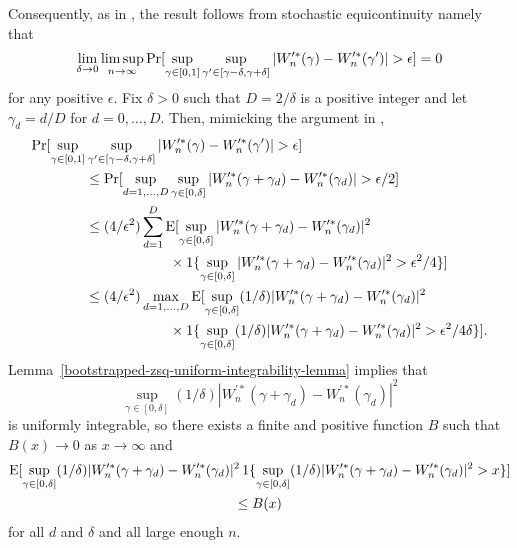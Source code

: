 \documentclass[11pt]{article}
\begin{document}
Consequently, as in \cite{JoD:00b}, the result follows from stochastic
equicontinuity \citep[Theorems 15.4 and 15.5]{Bil:68} namely that
\begin{equation*}
  \lim_{\delta \to 0} \limsup_{n \to \infty} \operatorname{Pr}[\sup_{\gamma \in [0,1]}
  \sup_{\gamma' \in [\gamma - \delta, \gamma + \delta]}
    | W_n^{\prime *}(\gamma) - W_n^{\prime *}(\gamma') | > \epsilon] = 0
\end{equation*}
for any positive $\epsilon$.  Fix $\delta> 0$ such that $D = 2/\delta$
is a positive integer and let $\gamma_d = d/D$ for $d =
0,\dots,D$. Then, mimicking the argument in \cite{JoD:00b},
\begin{align*}
  \operatorname{Pr}[\sup_{\gamma \in [0,1]} &
  \sup_{\gamma' \in [\gamma - \delta, \gamma + \delta]}
  | W_n^{\prime *}(\gamma) - W_n^{\prime *}(\gamma') | > \epsilon] \\
  &\leq \operatorname{Pr}[ \sup_{d = 1,\dots,D} \sup_{\gamma \in [0,\delta]}
  | W_n^{\prime *}(\gamma + \gamma_d) - W_n^{\prime *}(\gamma_d) | > \epsilon/2] \\
  &\leq  (4/\epsilon^2) \sum_{d=1}^D \operatorname{E}[\sup_{\gamma \in [0,\delta]}
  | W_n^{\prime *}(\gamma + \gamma_d) - W_n^{\prime *}(\gamma_d) |^2 \\
  &\qquad\qquad\qquad \times \operatorname{1}\{\sup_{\gamma \in [0,\delta]}
  | W_n^{\prime *}(\gamma + \gamma_d) - W_n^{\prime *}(\gamma_d) |^2 > \epsilon^2/4\}] \\
  &\leq  (4/\epsilon^2) \max_{d=1,\dots,D} \operatorname{E}[\sup_{\gamma \in [0,\delta]}
  (1/\delta) | W_n^{\prime *}(\gamma + \gamma_d) - W_n^{\prime *}(\gamma_d) |^2 \\
  &\qquad\qquad\qquad \times \operatorname{1}\{\sup_{\gamma \in [0,\delta]}
  (1/\delta) | W_n^{\prime *}(\gamma + \gamma_d) - W_n^{\prime *}(\gamma_d) |^2 > \epsilon^2/4\delta\}].
\end{align*}
Lemma~\ref{bootstrapped-zsq-uniform-integrability-lemma} implies that
\begin{equation*}
  \sup_{\gamma \in [0,\delta]}
  (1/\delta) | W_n^{\prime *}(\gamma + \gamma_d) - W_n^{\prime *}(\gamma_d) |^2
\end{equation*}
is uniformly integrable, so there exists a finite and positive
function $B$ such that $B(x) \to 0$ as $x \to \infty$ and
\begin{multline*}
  \operatorname{E}[\sup_{\gamma \in [0,\delta]}
  (1/\delta) | W_n^{\prime *}(\gamma + \gamma_d) - W_n^{\prime *}(\gamma_d) |^2
  \operatorname{1}\{\sup_{\gamma \in [0,\delta]}
  (1/\delta) | W_n^{\prime *}(\gamma + \gamma_d) - W_n^{\prime *}(\gamma_d) |^2 > x\}] \\
  \leq B(x)
\end{multline*}
for all $d$ and $\delta$ and all large enough $n$.
\end{document}
